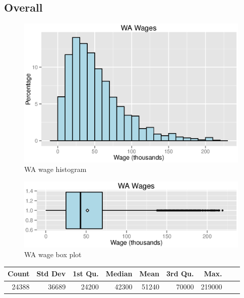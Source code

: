 \documentclass{exam}
\begin{document}
  \subsection{Overall}
  \begin{figure}[H]
    \centering
    \includegraphics[scale = 0.8]{figures/wa_wage_histogram.eps}
    \caption{WA wage histogram}
  \end{figure}

  \begin{figure}[H]
    \centering
    \includegraphics{figures/wa_wage.eps}
    \caption{WA wage box plot}
  \end{figure}

  \begin{table}[ht]
    \centering
    \begin{tabular}{rrrrrrrrr}
      \toprule
        Count & Std Dev & 1st Qu. & Median & Mean  & 3rd Qu. & Max. \\
      \midrule
        24388 & 36689   & 24200   & 42300  & 51240 & 70000   & 219000 \\
      \bottomrule
    \end{tabular}
  \end{table}
\end{document}
